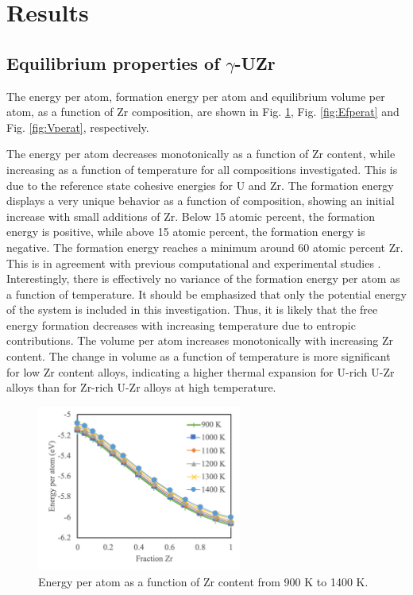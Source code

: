 \documentclass[review]{elsarticle}
\begin{document}
\section{Results}
\subsection{Equilibrium properties of $\gamma$-UZr}\label{sec:res1}

The energy per atom, formation energy per atom and equilibrium volume per atom, as a function of Zr composition, are shown in Fig. \ref{fig:Eperat}, Fig. \ref{fig:Efperat} and Fig. \ref{fig:Vperat}, respectively. 

The energy per atom decreases monotonically as a function of Zr content, while increasing as a function of temperature for all compositions investigated. This is due to the reference state cohesive energies for U and Zr. The formation energy displays a very unique behavior as a function of composition, showing an initial increase with small additions of Zr. Below 15 atomic percent, the formation energy is positive, while above 15 atomic percent, the formation energy is negative. The formation energy reaches a minimum around 60 atomic percent Zr. This is in agreement with previous computational and experimental studies \cite{moore2015}. Interestingly, there is effectively no variance of the formation energy per atom as a function of temperature. It should be emphasized that only the potential energy of the system is included in this investigation. Thus, it is likely that the free energy formation decreases with increasing temperature due to entropic contributions. The volume per atom increases monotonically with increasing Zr content. The change in volume as a function of temperature is more significant for low Zr content alloys, indicating a higher thermal expansion for U-rich U-Zr alloys than for Zr-rich U-Zr alloys at high temperature. 

\begin{figure}[!htp]
\begin{center}
\includegraphics[width=0.6\textwidth]{Eperat}
\end{center}
\caption{Energy per atom as a function of Zr content from 900 K to 1400 K. }
\label{fig:Eperat}
\end{figure}
\end{document}
